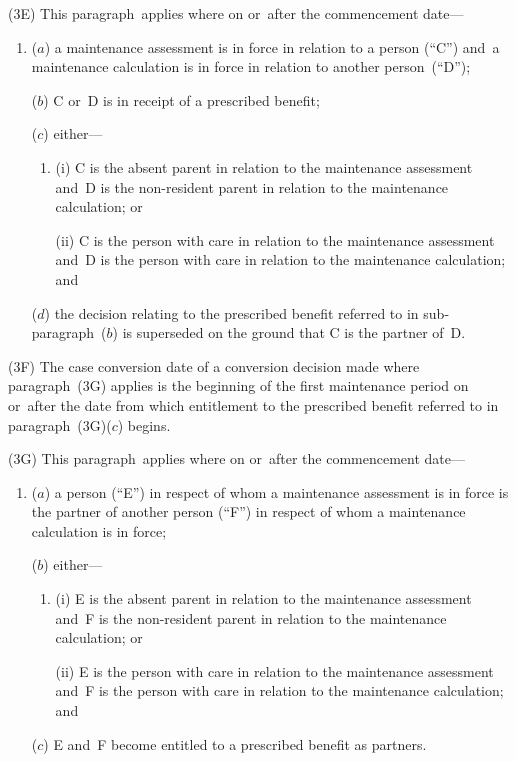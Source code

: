 \documentclass[12pt,a4paper]{article}
\begin{document}
(3E) This paragraph~applies where on or~after the commencement date—
\begin{enumerate}\item[]
($a$) a maintenance assessment is in force in relation to a person (“C”) and~a maintenance calculation is in force in relation to another person~(“D”);

($b$) C or~D is in receipt of a prescribed benefit;

($c$) either—
\begin{enumerate}\item[]
(i) C is the absent parent in relation to the maintenance assessment and~D is the non-resident parent in relation to the maintenance calculation; or

(ii) C is the person with care in relation to the maintenance assessment and~D is the person with care in relation to the maintenance calculation; and
\end{enumerate}

($d$) the decision relating to the prescribed benefit referred to in sub-paragraph~($b$)  is superseded on the ground that C is the partner of~D.
\end{enumerate}

(3F) The case conversion date of a conversion decision made where paragraph~(3G) applies is the beginning of the first maintenance period on or~after the date from which entitlement to the prescribed benefit referred to in paragraph~(3G)($c$)  begins.

(3G) This paragraph~applies where on or~after the commencement date—
\begin{enumerate}\item[]
($a$) a person (“E”) in respect of whom a maintenance assessment is in force is the partner of another person (“F”) in respect of whom a maintenance calculation is in force;

($b$) either—
\begin{enumerate}\item[]
(i) E is the absent parent in relation to the maintenance assessment and~F is the non-resident parent in relation to the maintenance calculation; or

(ii) E is the person with care in relation to the maintenance assessment and~F is the person with care in relation to the maintenance calculation; and
\end{enumerate}

($c$) E and~F become entitled to a prescribed benefit as partners.
\end{enumerate}
\end{document}
